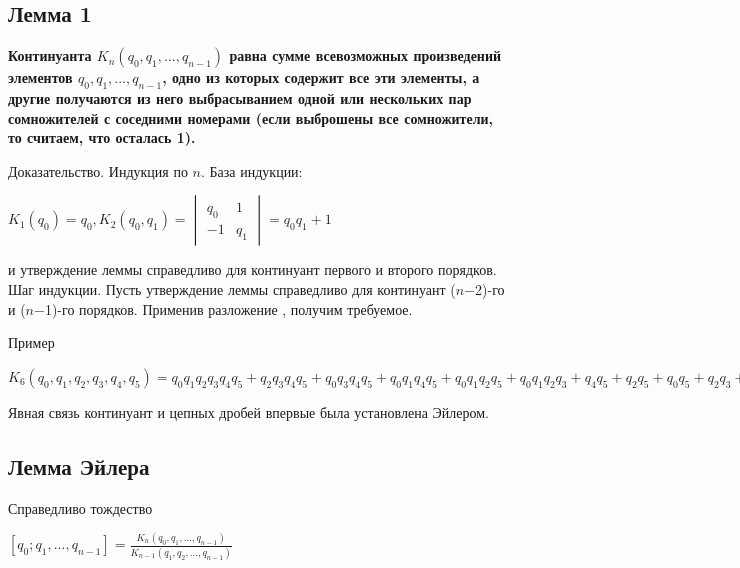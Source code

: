 \documentclass[12pt]{article}
\begin{document}
\subsection{Лемма 1}
\textbf{Континуанта $K_n(q_0, q_1, . . . , q_{n−1})$ равна сумме всевозможных произведений элементов $q_0, q_1, . . . , q_{n−1}$, одно из которых содержит
    все эти элементы, а другие получаются из него выбрасыванием одной или
    нескольких пар сомножителей с соседними номерами (если выброшены все
    сомножители, то считаем, что осталась 1).}\par
Доказательство. Индукция по $n$. База индукции:\par
$K_1(q_0) = q_0, K_2(q_0, q_1) = \begin{vmatrix}
        q_0 & 1   \\
        -1  & q_1
    \end{vmatrix}= q_0q_1 + 1$\par
и утверждение леммы справедливо для континуант первого и второго порядков.
Шаг индукции. Пусть утверждение леммы справедливо для континуант ($n$−2)-го и ($n$−1)-го порядков. Применив разложение , получим
требуемое. \par

Пример\par
$K_6(q_0, q_1, q_2, q_3, q_4, q_5) = q_0 q_1 q_2 q_3 q_4 q_5 + q_2 q_3 q_4 q_5 + q_0 q_3 q_4 q_5 + q_0 q_1 q_4 q_5 + q_0 q_1 q_2 q_5 + q_0 q_1 q_2 q_3 + q_4 q_5 + q_2 q_5 + q_0 q_5 + q_2 q_3 + q_0 q_3 + q_0 q_1 + 1$\par
Явная связь континуант и цепных дробей впервые была установлена
Эйлером.
\subsection{Лемма Эйлера}
Справедливо тождество\par
$[q_0;q_1,...,q_{n-1}] = \frac{K_n(q_0, q_1, . . . , q_{n−1})}{K_{n-1}(q_1, q_2, . . . , q_{n−1})}$\par
\end{document}
